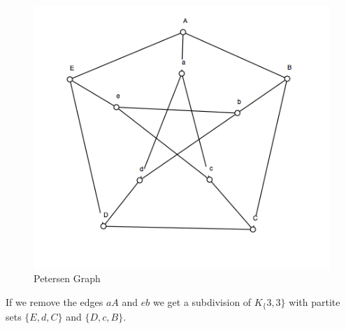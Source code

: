 \begin{figure}
\includegraphics[scale=.5]{petersengraph}
\caption{Petersen Graph}
\end{figure}
If we remove the edges $aA$ and $eb$ we get a subdivision of $K_\{3,3\}$
with partite sets $\{E,d,C\}$ and $\{D,c,B\}$.
